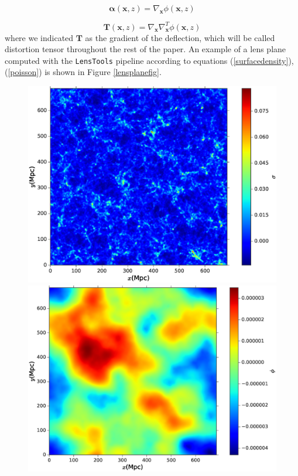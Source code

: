 \documentclass[5p]{elsarticle}
\newcommand{\bb}[1]{\mathbf{#1}}
\newcommand{\LT}{\texttt{LensTools} }
\begin{document}
\begin{equation}
\pmb{\alpha}(\bb{x},z) = \nabla_\bb{x} \phi(\bb{x},z)
\end{equation}

\begin{equation}
\bb{T}(\bb{x},z) = \nabla_\bb{x}\nabla_\bb{x}^T \phi(\bb{x},z)
\end{equation}
%
where we indicated $\bb{T}$ as the gradient of the deflection, which will be called distortion tensor throughout the rest of the paper. An example of a lens plane computed with the \LT pipeline according to equations (\ref{surfacedensity}),(\ref{poisson}) is shown in Figure \ref{lensplanefig}. 

\begin{figure}
\begin{center}
\includegraphics[scale=0.35]{Figures/lens_plane_density.eps}
\includegraphics[scale=0.35]{Figures/lens_plane_potential.eps}

\end{center}
\end{figure}
\end{document}
